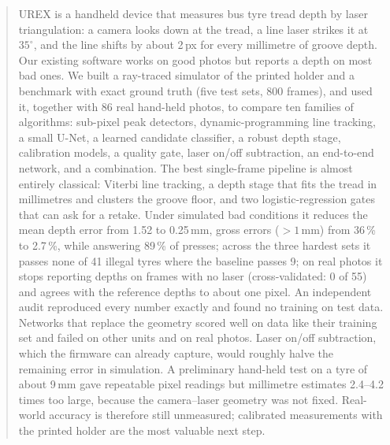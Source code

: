 \begin{abstract}
\noindent UREX is a handheld device that measures bus tyre tread depth by laser triangulation: a camera looks down at
the tread, a line laser strikes it at $35^\circ$, and the line shifts by about 2\,px for every millimetre of groove
depth. Our existing software works on good photos but reports a depth on most bad ones. We built a ray-traced
simulator of the printed holder and a benchmark with exact ground truth (five test sets, 800 frames), and used it,
together with 86 real hand-held photos, to compare ten families of algorithms: sub-pixel peak detectors,
dynamic-programming line tracking, a small U-Net, a learned candidate classifier, a robust depth stage, calibration
models, a quality gate, laser on/off subtraction, an end-to-end network, and a combination. The best single-frame
pipeline is almost entirely classical: Viterbi line tracking, a depth stage that fits the tread in millimetres and
clusters the groove floor, and two logistic-regression gates that can ask for a retake. Under simulated bad
conditions it reduces the mean depth error from 1.52 to 0.25\,mm, gross errors ($>1$\,mm) from 36\,\% to 2.7\,\%, while
answering 89\,\% of presses; across the three hardest sets it passes none of 41 illegal tyres where the baseline
passes 9; on real photos it stops reporting
depths on frames with no laser (cross-validated: 0 of 55) and agrees with the reference depths to about one pixel.
An independent audit reproduced every number exactly and found no training on test data. Networks that replace the geometry scored well on data like their training set and failed on other units and on
real photos. Laser on/off subtraction, which the firmware can already capture, would roughly halve the remaining error in simulation. A
preliminary hand-held test on a tyre of about 9\,mm gave repeatable pixel readings but millimetre estimates 2.4--4.2
times too large, because the camera--laser geometry was not fixed. Real-world accuracy is therefore still unmeasured;
calibrated measurements with the printed holder are the most valuable next step.
\end{abstract}
